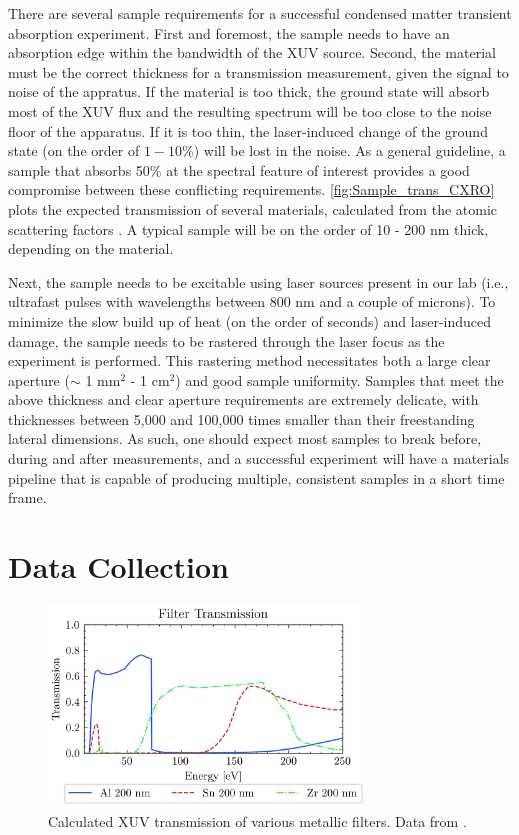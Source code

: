 There are several sample requirements for a successful condensed matter transient absorption experiment. First and foremost, the sample needs to have an absorption edge within the bandwidth of the XUV source. Second, the material must be the correct thickness for a transmission measurement, given the signal to noise of the appratus. If the material is too thick, the ground state will absorb most of the XUV flux and the resulting spectrum will be too close to the noise floor of the apparatus. If it is too thin, the laser-induced change of the ground state (on the order of $1-10\%$) will be lost in the noise. As a general guideline, a sample that absorbs 50\% at the spectral feature of interest provides a good compromise between these conflicting requirements. \cref{fig:Sample_trans_CXRO} plots the expected transmission of several materials, calculated from the atomic scattering factors \cite{gulliksonCXROXRayInteractions}. A typical sample will be on the order of 10 - 200 nm thick, depending on the material.

Next, the sample needs to be excitable using laser sources present in our lab (i.e., ultrafast pulses with wavelengths between 800 nm and a couple of microns). To minimize the slow build up of heat (on the order of seconds) and laser-induced damage, the sample needs to be rastered through the laser focus as the experiment is performed. This rastering method necessitates both a large clear aperture ($\sim$ 1 mm$^2$ - 1 cm$^2$) and good sample uniformity. Samples that meet the above thickness and clear aperture requirements are extremely delicate, with thicknesses between 5,000 and 100,000 times smaller than their freestanding lateral dimensions. As such, one should expect most samples to break before, during and after measurements, and a successful experiment will have a materials pipeline that is capable of producing multiple, consistent samples in a short time frame.

\section{Data Collection}

\begin{figure}
	\centering
	\includegraphics[width=0.75\textwidth]{figures/chap3/Filter_transmission_CXRO.png}
	\caption{Calculated XUV transmission of various metallic filters. Data from \cite{gulliksonCXROXRayInteractions}.}
	\label{fig:Filter_transmission_CXRO}
\end{figure}

